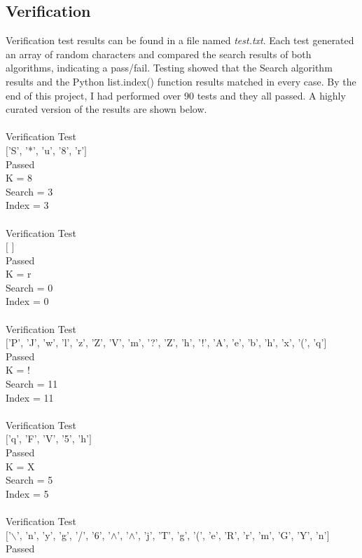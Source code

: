 \documentclass{article}
\begin{document}
\subsection{Verification}
Verification test results can be found in a file named \textit{test.txt}. Each test generated an array of random characters and compared the search results of both algorithms, indicating a pass/fail. Testing showed that the Search algorithm results and the Python list.index() function results matched in every case. By the end of this project, I had performed over 90 tests and they all passed. A highly curated version of the results are shown below. \\ \\
\ttfamily
Verification Test \\
$[$'S', '*', 'u', '8', 'r'$]$ \\
Passed \\
K = 8 \\
Search =  3 \\
Index =  3 \\
\\
Verification Test \\
$[$ $]$ \\
Passed \\
K = r \\
Search =  0 \\
Index =  0 \\
 \\
Verification Test \\
$[$'P', 'J', 'w', 'l', 'z', 'Z', 'V', 'm', '?', 'Z', 'h', '!', 'A', 'e', 'b', 'h', 'x', '(', 'q'$]$ \\
Passed \\
K = ! \\
Search =  11 \\
Index =  11 \\
\\
Verification Test \\
$[$'q', 'F', 'V', '5', 'h'$]$ \\
Passed \\
K = X \\
Search =  5 \\
Index =  5 \\
\\
Verification Test \\
$[$'$\backslash$', 'n', 'y', 'g', '/', '6', '$\wedge$', '$\wedge$', 'j', 'T', 'g', '(', 'e', 'R', 'r', 'm', 'G', 'Y', 'n'$]$ \\
Passed \\
\end{document}
